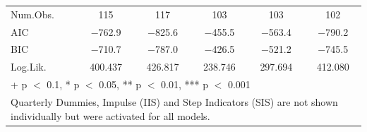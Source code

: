 \begin{table}
{\begin{tabular}[t]{lccccc}
\midrule
Num.Obs. & \num{115} & \num{117} & \num{103} & \num{103} & \num{102}\\
AIC & \num{-762.9} & \num{-825.6} & \num{-455.5} & \num{-563.4} & \num{-790.2}\\
BIC & \num{-710.7} & \num{-787.0} & \num{-426.5} & \num{-521.2} & \num{-745.5}\\
Log.Lik. & \num{400.437} & \num{426.817} & \num{238.746} & \num{297.694} & \num{412.080}\\
\bottomrule
\multicolumn{6}{l}{\rule{0pt}{1em}+ p $<$ 0.1, * p $<$ 0.05, ** p $<$ 0.01, *** p $<$ 0.001}\\
\multicolumn{6}{l}{\rule{0pt}{1em}Quarterly Dummies, Impulse (IIS) and Step Indicators (SIS) are not shown individually but were activated for all models.}\\
\end{tabular}}
\end{table}
